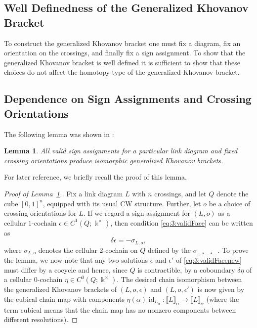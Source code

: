 \documentclass[12pt]{amsart}
\theoremstyle{definition}
\theoremstyle{plain}
\newtheorem{lemma}{Lemma}
\begin{document}
\subsection{Well Definedness of the Generalized Khovanov Bracket}

To construct the generalized Khovanov bracket one must fix a diagram, fix an orientation on the crossings, and finally fix a sign assignment.  To show that the generalized Khovanov bracket is well defined it is sufficient to show that these choices do not affect the homotopy type of the generalized Khovanov bracket. 


\subsection{Dependence on Sign Assignments and Crossing Orientations}\label{subs:signs}
The following lemma was shown in \cite{ORS2007,Pu2015}:

\begin{lemma}
    \label{lem:3:signinv}
    All valid sign assignments for a particular link diagram and fixed crossing orientations produce isomorphic generalized Khovanov brackets.
\end{lemma}

For later reference, we briefly recall the proof of this lemma.

\begin{proof}[Proof of Lemma~\ref{lem:3:signinv}.]
Fix a link diagram $L$ with $n$ crossings, and let $Q$ denote the cube $[0,1]^n$, equipped
with its usual CW structure. Further, let $o$ be a choice of crossing orientations for $L$.
If we regard a sign assignment for $(L,o)$ as a cellular $1$-cochain $\epsilon\in C^1(Q;\Bbbk^\times)$, then
condition \eqref{eq:3:validFace} can be written as
\begin{equation}\label{eq:3:validFacenew}
\delta\epsilon=-\sigma_{L,o},
\end{equation}
where $\sigma_{L,o}$ denotes the cellular 2-cochain on $Q$ defined by the $\sigma_{\ldots{\star}\dots{\star}\ldots}$. To prove the lemma,
we now note that any two solutions $\epsilon$ and $\epsilon'$ of \eqref{eq:3:validFacenew} must differ by a cocycle and hence, since $Q$
is contractible, by a coboundary $\delta\eta$ of a cellular $0$-cochain $\eta\in C^0(Q;\Bbbk^\times)$.
The desired chain isomorphism between the generalized Khovanov brackets of $(L,o,\epsilon)$ and $(L,o,\epsilon')$
is now given by the cubical chain map with components
 $\eta(\alpha)\operatorname{id}_{L_\alpha}\colon\llbracket L\rrbracket_\alpha\rightarrow\llbracket L\rrbracket_\alpha$
(where the term cubical means that the chain map has no nonzero components between different resolutions).
\end{proof}
\end{document}
